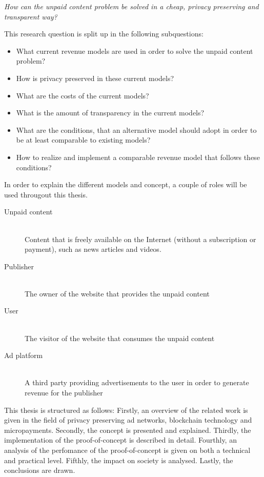 \textit{How can the unpaid content problem be solved in a cheap, privacy preserving and transparent way?}
\vspace{1em}

\noindent This research question is split up in the following subquestions:

\begin{itemize}
  \item What current revenue models are used in order to solve the unpaid content problem?
  \item How is privacy preserved in these current models?
  \item What are the costs of the current models?
  \item What is the amount of transparency in the current models?
  \item What are the conditions, that an alternative model should adopt in order to be at least comparable to existing models?
  \item How to realize and implement a comparable revenue model that follows these conditions?
\end{itemize}

\label{sec:methodology}
\noindent In order to explain the different models and concept, a couple of roles will be used througout this thesis.

\begin{description}
  \item[Unpaid content] \hfill \\ Content that is freely available on the Internet (without a subscription or payment), such as news articles and videos.
  \item[Publisher] \hfill \\ The owner of the website that provides the unpaid content
  \item[User] \hfill \\ The visitor of the website that consumes the unpaid content
  \item[Ad platform] \hfill \\ A third party providing advertisements to the user in order to generate revenue for the publisher
\end{description} 

\noindent This thesis is structured as follows: Firstly, an overview of the related work is given in the field of privacy preserving ad networks, blockchain technology and micropayments. Secondly, the concept is presented and explained. Thirdly, the implementation of the proof-of-concept is described in detail. Fourthly, an analysis of the perfomance of the proof-of-concept is given on both a technical and practical level. Fifthly, the impact on society is analysed. Lastly, the conclusions are drawn.